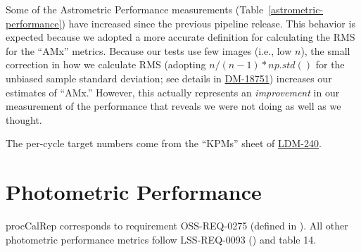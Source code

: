 \documentclass[DM,lsstdraft,toc]{lsstdoc}
\begin{document}
Some of the Astrometric Performance measurements (Table~\ref{astrometric-performance}) have increased since the previous pipeline release. This behavior is expected because we adopted a more accurate definition for calculating the RMS for the ``AMx'' metrics. Because our tests use few images (i.e., low $n$), the small correction in how we calculate RMS (adopting $n/(n-1)*np.std()$ for the unbiased sample standard deviation; see details in \href{https://jira.lsstcorp.org/browse/DM-18751}{DM-18751}) increases our estimates of ``AMx.'' However, this actually represents an \emph{improvement} in our measurement of the performance that reveals we were not doing as well as we thought.

The per-cycle target numbers come from the ``KPMs'' sheet of \href{http://ls.st/LDM-240}{LDM-240}.

\section{Photometric Performance}\label{photometric-performance}


procCalRep corresponds to requirement OSS-REQ-0275 (defined in
). All other photometric performance
metrics follow LSS-REQ-0093 () and
 table 14.
\end{document}
